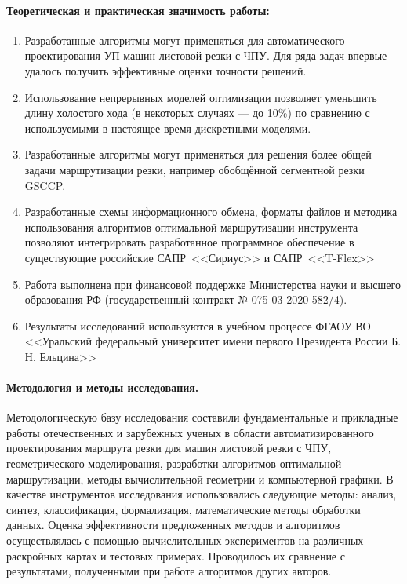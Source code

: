 \paragraph*{Теоретическая и практическая значимость работы:}

\begin{enumerate}
    \item
    Разработанные алгоритмы могут применяться для
    автоматического проектирования УП машин листовой резки с ЧПУ.
    Для ряда задач впервые удалось получить эффективные оценки точности решений.
    \item
    Использование непрерывных моделей оптимизации
    позволяет уменьшить длину
    холостого хода
    (в некоторых случаях --- до 10\%)
    по сравнению с используемыми
    в настоящее время дискретными моделями.
    \item
    Разработанные алгоритмы могут применяться для решения
    более общей задачи
    маршрутизации резки,
    например обобщённой сегментной резки GSCCP.
    \item
    Разработанные схемы информационного обмена,
    форматы файлов и методика использования алгоритмов
    оптимальной маршрутизации инструмента
    позволяют интегрировать разработанное программное обеспечение
    в существующие российские САПР~<<Сириус>>
    и САПР~<<T-Flex>>
    \item
    Работа выполнена при финансовой поддержке
    Министерства науки и высшего образования РФ
    (государственный контракт № 075-03-2020-582/4).
    \item
    Результаты исследований используются в учебном процессе
    ФГАОУ ВО <<Уральский федеральный университет имени первого Президента России Б. Н. Ельцина>>
\end{enumerate}

\paragraph*{Методология и методы исследования.}

Методологическую базу исследования составили
фундаментальные и прикладные работы отечественных и зарубежных ученых
в области автоматизированного проектирования маршрута резки для машин листовой резки с ЧПУ,
геометрического моделирования,
разработки алгоритмов оптимальной маршрутизации,
методы вычислительной геометрии и компьютерной графики.
В качестве инструментов исследования использовались следующие методы:
анализ, синтез, классификация, формализация, математические методы обработки данных.
Оценка эффективности предложенных
методов и алгоритмов осуществлялась с помощью вычислительных экспериментов
на различных раскройных картах и тестовых примерах.
Проводилось их сравнение с результатами,
полученными при работе алгоритмов
других авторов.

